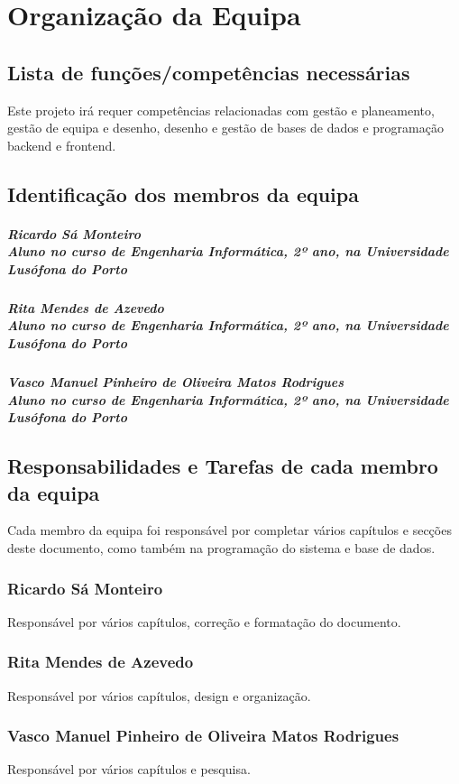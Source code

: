 \chapter{Organização da Equipa}
\label{organizacao_da_equipa}
\section{Lista de funções/competências necessárias}
Este projeto irá requer competências relacionadas com gestão e planeamento, gestão de equipa e desenho, desenho e gestão de bases de dados e programação backend e frontend.
\section{Identificação dos membros da equipa}
\paragraph{Ricardo Sá Monteiro 
\\ Aluno no curso de Engenharia Informática, 2º ano, na Universidade Lusófona do Porto}
\paragraph{Rita Mendes de Azevedo
\\ Aluno no curso de Engenharia Informática, 2º ano, na Universidade Lusófona do Porto}
\paragraph{Vasco Manuel Pinheiro de Oliveira Matos Rodrigues
\\ Aluno no curso de Engenharia Informática, 2º ano, na Universidade Lusófona do Porto}
\section{Responsabilidades e Tarefas de cada membro da equipa}
Cada membro da equipa foi responsável por completar vários capítulos e secções deste documento, como também na programação do sistema e base de dados.
\subsection{Ricardo Sá Monteiro}
Responsável por vários capítulos, correção e formatação do documento.
\subsection{Rita Mendes de Azevedo}
Responsável por vários capítulos, design e organização.
\subsection{Vasco Manuel Pinheiro de Oliveira Matos Rodrigues}
Responsável por vários capítulos e pesquisa.
